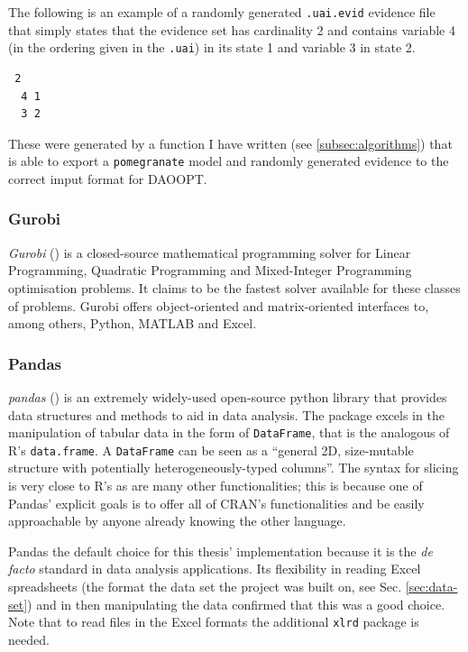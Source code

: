 The following is an example of a randomly generated \texttt{.uai.evid} evidence file that simply states that the evidence set has cardinality 2 and contains variable 4 (in the ordering given in the \texttt{.uai}) in its state 1 and variable 3 in state 2.

\begin{verbatim}
 2
  4 1
  3 2
\end{verbatim}

These were generated by a function I have written (see \ref{subsec:algorithms}) that is able to export a \texttt{pomegranate} model and randomly generated evidence to the correct imput format for DAOOPT.

\subsubsection{Gurobi}
\textit{Gurobi} (\cite{gurobi}) is a closed-source mathematical programming solver for Linear Programming, Quadratic Programming and Mixed-Integer Programming optimisation problems.
It claims to be the fastest solver available for these classes of problems.
Gurobi offers object-oriented and matrix-oriented interfaces to, among others, Python, MATLAB and Excel.

\subsubsection{Pandas}
\textit{pandas} (\cite{pandas}) is an extremely widely-used open-source python library that provides data structures and methods to aid in data analysis.
The package excels in the manipulation of tabular data in the form of \texttt{DataFrame}, that is the analogous of R's \texttt{data.frame}.
A \texttt{DataFrame} can be seen as a \enquote{general 2D, size-mutable structure with potentially heterogeneously-typed columns}.
The syntax for slicing is very close to R's as are many other functionalities; this is because one of Pandas' explicit goals is to offer all of CRAN's functionalities and be easily approachable by anyone already knowing the other language.

Pandas the default choice for this thesis' implementation because it is the \textit{de facto} standard in data analysis applications.
Its flexibility in reading Excel spreadsheets (the format the data set the project was built on, see Sec. \ref{sec:data-set}) and in then manipulating the data confirmed that this was a good choice.
Note that to read files in the Excel formats the additional \texttt{xlrd} package is needed.

